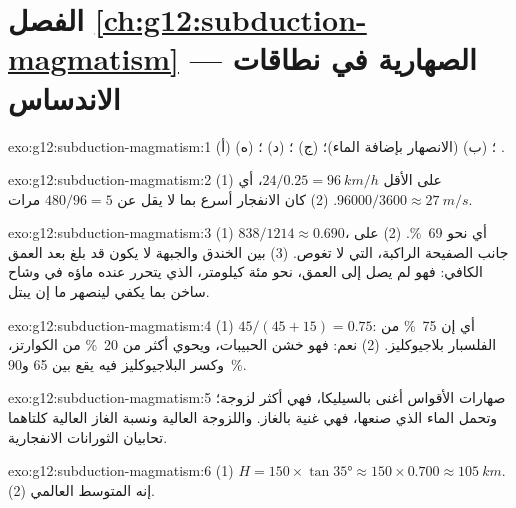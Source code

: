 \section*{الفصل \ref{ch:g12:subduction-magmatism} --- الصهارية في نطاقات الاندساس}

\begin{solution}{exo:g12:subduction-magmatism:1}
(أ) ؛ (ب)  (الانصهار بإضافة الماء)؛ (ج) ؛
(د) ؛ (ه) .
\end{solution}

\begin{solution}{exo:g12:subduction-magmatism:2}
(1) على الأقل $24/0.25 = \qty{96}{km/h}$، أي $\num{96000}/3600 \approx
\qty{27}{m/s}$. (2) كان الانفجار أسرع بما لا يقل عن $480/96 = 5$ مرات.
\end{solution}

\begin{solution}{exo:g12:subduction-magmatism:3}
(1) $838/1214 \approx 0.690$، أي نحو \qty{69}{\percent}. (2) على جانب
الصفيحة الراكبة، التي لا تغوص. (3) بين الخندق
والجبهة لا يكون  قد بلغ بعد العمق الكافي: فهو لم يصل إلى العمق،
نحو مئة كيلومتر، الذي يتحرر عنده ماؤه في وشاح ساخن
بما يكفي لينصهر ما إن يبتل.
\end{solution}

\begin{solution}{exo:g12:subduction-magmatism:4}
(1) $45/(45 + 15) = 0.75$: أي إن \qty{75}{\percent} من الفلسبار
بلاجيوكليز. (2) نعم: فهو خشن الحبيبات، ويحوي أكثر من
\qty{20}{\percent} من الكوارتز، وكسر البلاجيوكليز فيه يقع بين 65
و\qty{90}{\percent}.
\end{solution}

\begin{solution}{exo:g12:subduction-magmatism:5}
صهارات الأقواس أغنى بالسيليكا، فهي أكثر لزوجة؛ وتحمل
الماء الذي صنعها، فهي غنية بالغاز. واللزوجة العالية
ونسبة الغاز العالية كلتاهما تحابيان الثورانات الانفجارية.
\end{solution}

\begin{solution}{exo:g12:subduction-magmatism:6}
(1) $H = 150 \times \tan\ang{35} \approx 150 \times 0.700 \approx
\qty{105}{km}$. (2) إنه المتوسط العالمي.
\end{solution}

